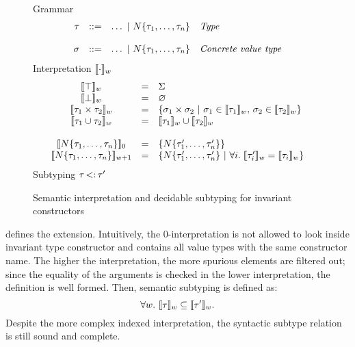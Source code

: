 \begin{figure}[t]
\footnotesize
Grammar
\[\begin{array}{rcll}
    \tau &::=& \ldots ~\vert~ N\{\tau_1,\ldots,\tau_n\}
        & \textit{Type} \\
    \\
    \sigma &::=& \ldots ~\vert~ N\{\tau_1,\ldots,\tau_n\}
        & \textit{Concrete value type} \\
\end{array}\]
Interpretation $\llbracket \cdot \rrbracket_w$
\[
    \begin{array}{ccl}
        \interp{\tyany}_w &=& \Sigma \\
        \interp{\tybot}_w &=& \varnothing \\
        \interp{\typair{\ty_1}{\ty_2}}_w &=& 
            \{ \typair{\gty_1}{\gty_2} \ | \ 
            \gty_1 \in \interp{\ty_1}_w,\,\gty_2 \in \interp{\ty_2}_w \} \\
        \interp{\tyunion{\ty_1}{\ty_2}}_w &=& 
            \interp{\ty_1}_w \cup \interp{\ty_2}_w \\
        \\
        \interp{\tyinv\iname{\ty_1,\ldots,\ty_n}}_0 &=& 
            \{ \tyinv\iname{\ty'_1,\ldots,\ty'_n} \} \\
        \interp{\tyinv\iname{\ty_1,\ldots,\ty_n}}_{w+1} &=& 
            \{ \tyinv\iname{\ty'_1,\ldots,\ty'_n} \ |\ 
                \forall i.\; \interp{\ty'_i}_w = \interp{\ty_i}_w \} \\
    \end{array}
\]
Subtyping $\tau \operatorname{<:} \tau'$\\
\caption{Semantic interpretation and decidable subtyping for
invariant constructors}\label{fig:sem:ty-inv}
\end{figure}

 defines the extension.
Intuitively, the $0$-interpretation is not allowed to look inside invariant
type constructor and contains all value types with the same constructor name.
The higher the interpretation, the more spurious elements are filtered out;
since the equality of the arguments is checked in the lower interpretation,
the definition is well formed.
Then, semantic subtyping is defined as:
\[
  \forall w.\ \llbracket \tau \rrbracket_w \subseteq \llbracket \tau' \rrbracket_w.
\]
Despite the more complex indexed interpretation, the syntactic subtype relation
is still sound and complete.

